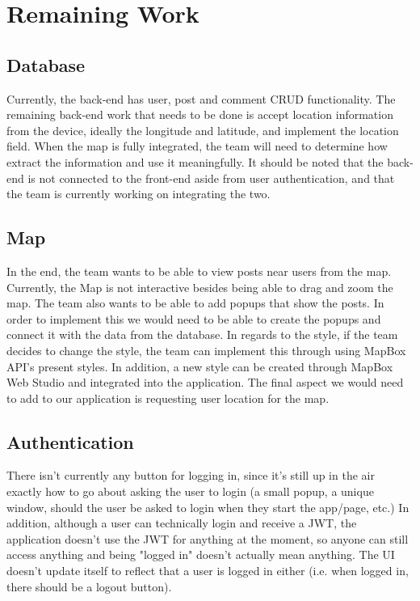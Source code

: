 \documentclass[draftclsnofoot, onecolumn, letterpaper,10pt,compsoc]{IEEEtran}
\begin{document}
\section{Remaining Work}
\subsection{Database}
Currently, the back-end has user, post and comment CRUD functionality.  The remaining back-end work that needs to be done is accept location information from the device, ideally the longitude and latitude, and implement the location field.  When the map is fully integrated, the team will need to determine how extract the information and use it meaningfully.  It should be noted that the back-end is not connected to the front-end aside from user authentication, and that the team is currently working on integrating the two. 

\subsection{Map}
In the end, the team wants to be able to view posts near users from the map. Currently, the Map is not interactive besides being able to drag and zoom the map. The team also wants to be able to add popups that show the posts. In order to implement this we would need to be able to create the popups and connect it with the data from the database. In regards to the style, if the team decides to change the style, the team can implement this through using MapBox API's present styles. In addition, a new style can be created through MapBox Web Studio and integrated into the application. The final aspect we would need to add to our application is requesting user location for the map.

\subsection{Authentication}
There isn't currently any button for logging in, since it's still up in the air exactly how to go about asking the user to login (a small popup, a unique window, should the user be asked to login when they start the app/page, etc.) In addition, although a user can technically login and receive a JWT, the application doesn't use the JWT for anything at the moment, so anyone can still access anything and being "logged in" doesn't actually mean anything. The UI doesn't update itself to reflect that a user is logged in either (i.e. when logged in, there should be a logout button). 
\end{document}
